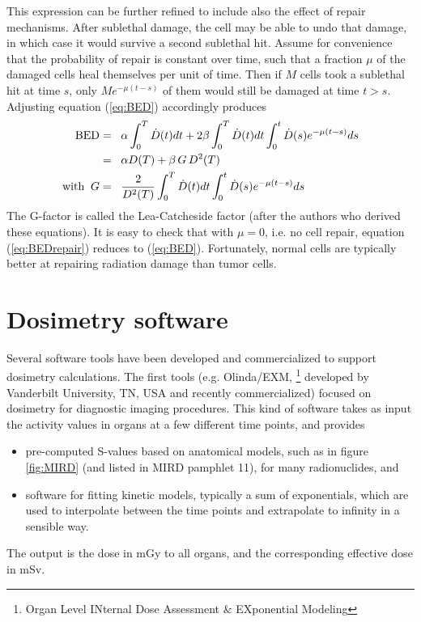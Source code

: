 \documentclass[11pt,oneside]{book}
\begin{document}
This expression can be further refined to include also the effect of
repair mechanisms. After sublethal damage, the cell may be able to
undo that damage, in which case it would survive a second sublethal
hit. Assume for convenience that the probability of repair is constant
over time, such that a fraction $\mu$ of the damaged cells heal
themselves per unit of time. Then if $M$ cells took a sublethal hit at
time $s$, only $M e^{-\mu (t - s)}$ of them would still be damaged at
time $t > s$. Adjusting equation (\ref{eq:BED}) accordingly produces
\begin{align}
  \mbox{BED} &=\;\; \alpha \int_0^T \dot D(t) dt
  + 2 \beta \int_0^T \dot D(t) dt
  \int_0^t \dot D(s) e^{-\mu(t-s)}ds \nonumber\\
  &=\;\; \alpha D(T) + \beta \, G \, D^2(T) \label{eq:BEDrepair}\\
  \mbox{with\;\;} G &=\;\; \frac{2}{D^2(T)} \int_0^T \dot D(t) dt
    \int_0^t \dot D(s) e^{-\mu(t-s)}ds \nonumber
\end{align}
The G-factor is called the Lea-Catcheside factor (after the authors
who derived these equations). It is easy to check that with $\mu =
0$, i.e. no cell repair, equation (\ref{eq:BEDrepair}) reduces to
(\ref{eq:BED}). Fortunately, normal cells are typically better at
repairing radiation damage than tumor cells.

\section{Dosimetry software}
Several software tools have been developed and commercialized to
support dosimetry calculations. The first tools (e.g. Olinda/EXM,
\footnote{Organ Level INternal Dose Assessment \& EXponential
  Modeling} developed by Vanderbilt University, TN, USA and recently
commercialized) focused on dosimetry for diagnostic imaging
procedures. This kind of software takes as input the activity values
in organs at a few different time points, and provides
\begin{itemize}
  \item pre-computed S-values based on anatomical models, such as in
    figure \ref{fig:MIRD} (and listed in MIRD pamphlet 11), for many
    radionuclides, and
  \item software for fitting kinetic models, typically a sum of
    exponentials, which are used to interpolate between the time
    points and extrapolate to infinity in a sensible way.
\end{itemize}
The output is the dose in mGy to all organs, and the corresponding
effective dose in mSv.
\end{document}
